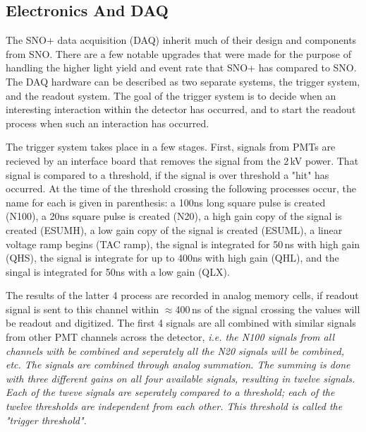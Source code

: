 \subsection{Electronics And DAQ}
The SNO+ data acquisition (DAQ) inherit much of their design and components from
SNO.
There are a few notable upgrades that were made for the purpose of handling the
higher light yield and event rate that SNO+ has compared to SNO.
The DAQ hardware can be described as two separate systems, the trigger system,
and the readout system.
The goal of the trigger system is to decide when an interesting interaction
within the detector has occurred, and to start the readout process when such an
interaction has occurred.

The trigger system takes place in a few stages.
First, signals from PMTs are recieved by an interface board that
removes the signal from the 2\,kV power.
That signal is compared to a threshold, if the signal is over threshold a "hit"
has occurred.
At the time of the threshold crossing the following processes occur, the name for each is given
in parenthesis:
a 100ns long square pulse is created (N100), a 20ns square pulse is created (N20),
a high gain copy of the signal is created (ESUMH), a low gain copy of the signal
is created (ESUML), a linear voltage ramp begins (TAC ramp), the signal is integrated for
50\,ns with high gain (QHS), the signal is integrate for up to 400ns with high gain (QHL),
and the singal is integrated for 50ns with a low gain (QLX).

The results of the latter 4 process are recorded in analog memory cells,
if readout signal is sent to this channel within $\approx$400\,ns of the
signal crossing the values will be readout and digitized.
The first 4 signals are all combined with similar signals from
other PMT channels across the detector, \it{i.e.} the N100 signals
from all channels with be combined and seperately all the
N20 signals will be combined, \it{etc}.
The signals are combined through analog summation.
The summing is done with three different gains on all
four available signals, resulting in twelve signals.
Each of the tweve signals are seperately compared to a threshold;
each of the twelve thresholds are independent from each other.
This threshold is called the "trigger threshold".

